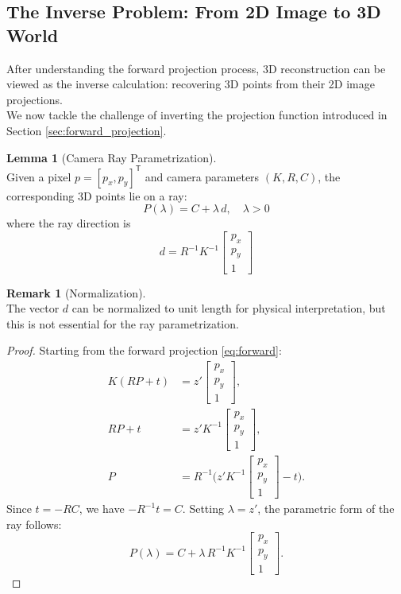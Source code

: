 \documentclass[12pt,a4paper]{article}
\theoremstyle{definition}
\newtheorem{lemma}{Lemma}[subsection]
\newtheorem{remark}{Remark}[subsection]
\begin{document}
\newpage

\subsection{The Inverse Problem: From 2D Image to 3D World} \label{sec:inverse_problem}

After understanding the forward projection process, 3D reconstruction can be viewed as the inverse calculation: recovering 3D points from their 2D image projections. \\  
We now tackle the challenge of inverting the projection function introduced in Section \ref{sec:forward_projection}.

\begin{lemma}[Camera Ray Parametrization] \label{lem:camera_ray} ~\\
Given a pixel \(p = [p_x, p_y]^\mathsf{T}\) and camera parameters \((K, R, C)\), the corresponding 3D points lie on a ray:
\begin{equation}
\boxed{P(\lambda) = C + \lambda \, d, \quad \lambda > 0}
\end{equation}
where the ray direction is
\begin{equation}
\boxed{d = R^{-1} K^{-1} \begin{bmatrix} p_x \\ p_y \\ 1 \end{bmatrix}}
\end{equation}
\begin{remark}[Normalization] ~\\
The vector \(d\) can be normalized to unit length for physical interpretation, but this is not essential for the ray parametrization.
\end{remark}
\end{lemma}

\begin{proof}
Starting from the forward projection \eqref{eq:forward}:
\begin{align*}
K (R P + t) &= z' \begin{bmatrix} p_x \\ p_y \\ 1 \end{bmatrix}, \\
R P + t &= z' K^{-1} \begin{bmatrix} p_x \\ p_y \\ 1 \end{bmatrix}, \\
P &= R^{-1} \bigl(z' K^{-1} \begin{bmatrix} p_x \\ p_y \\ 1 \end{bmatrix} - t \bigr).
\end{align*}
Since \(t = -R C\), we have \(-R^{-1} t = C\). Setting \(\lambda = z'\), the parametric form of the ray follows:
\[
P(\lambda) = C + \lambda \, R^{-1} K^{-1} \begin{bmatrix} p_x \\ p_y \\ 1 \end{bmatrix}.
\]
\end{proof}
\end{document}
